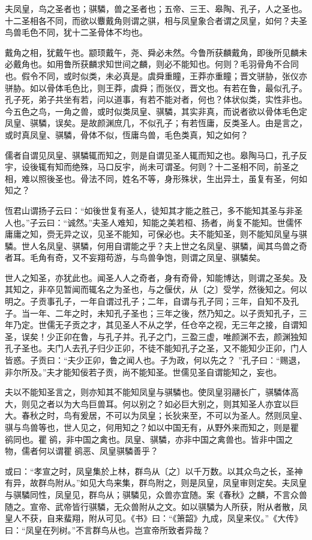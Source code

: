 \documentclass[]{article}
\begin{document}
夫凤皇，鸟之圣者也；骐驎，兽之圣者也；五帝、三王、皋陶、孔子，人之圣也。十二圣相各不同，而欲以麞戴角则谓之骐，相与凤皇象合者谓之凤皇，如何？夫圣鸟兽毛色不同，犹十二圣骨体不均也。

戴角之相，犹戴午也。颛顼戴午，尧、舜必未然。今鲁所获麟戴角，即後所见麟未必戴角也。如用鲁所获麟求知世间之麟，则必不能知也。何则？毛羽骨角不合同也。假令不同，或时似类，未必真是。虞舜重瞳，王莽亦重瞳；晋文骈胁，张仪亦骈胁。如以骨体毛色比，则王莽，虞舜；而张仪，晋文也。有若在鲁，最似孔子。孔子死，弟子共坐有若，问以道事，有若不能对者，何也？体状似类，实性非也。今五色之鸟，一角之兽，或时似类凤皇、骐驎，其实非真，而说者欲以骨体毛色定凤皇、骐驎，误矣。是故颜渊庶几，不似孔子；有若恆庸，反类圣人。由是言之，或时真凤皇、骐驎，骨体不似，恆庸鸟兽，毛色类真，知之如何？

儒者自谓见凤皇、骐驎辄而知之，则是自谓见圣人辄而知之也。皋陶马口，孔子反宇，设後辄有知而绝殊，马口反宇，尚未可谓圣。何则？十二圣相不同，前圣之相，难以照後圣也。骨法不同，姓名不等，身形殊状，生出异土，虽复有圣，何如知之？

恆君山谓扬子云曰：``如後世复有圣人，徒知其才能之胜己，多不能知其圣与非圣人也。''子云曰：``诚然。''夫圣人难知，知能之美若桓、扬者，尚复不能知。世儒怀庸庸之知，赍无异之议，见圣不能知，可保必也。夫不能知圣，则不能知凤皇与骐驎。世人名凤皇、骐驎，何用自谓能之乎？夫上世之名凤皇、骐驎，闻其鸟兽之奇者耳。毛角有奇，又不妄翔苟游，与鸟兽争饱，则谓之凤皇、骐驎矣。

世人之知圣，亦犹此也。闻圣人人之奇者，身有奇骨，知能博达，则谓之圣矣。及其知之，非卒见暂闻而辄名之为圣也，与之偃伏，从〔之〕受学，然後知之。何以明之。子贡事孔子，一年自谓过孔子；二年，自谓与孔子同；三年，自知不及孔子。当一年、二年之时，未知孔子圣也；三年之後，然乃知之。以子贡知孔子，三年乃定。世儒无子贡之才，其见圣人不从之学，任仓卒之视，无三年之接，自谓知圣，误矣！少正卯在鲁，与孔子并。孔子之门，三盈三虚，唯颜渊不去，颜渊独知孔子圣也。夫门人去孔子归少正卯，不徒不能知孔子之圣，又不能知少正卯，门人皆惑。子贡曰：``夫少正卯，鲁之闻人也。子为政，何以先之？
''孔子曰：``赐退，非尔所及。''夫才能知佞若子贡，尚不能知圣。世儒见圣自谓能知之，妄也。

夫以不能知圣言之，则亦知其不能知凤皇与骐驎也。使凤皇羽翮长广，骐驎体高大，则见之者以为大鸟巨兽耳。何以别之？如必巨大别之，则其知圣人亦宜以巨大。春秋之时，鸟有爰居，不可以为凤皇；长狄来至，不可以为圣人。然则凤皇、骐与鸟兽等也，世人见之，何用知之？如以中国无有，从野外来而知之，则是瞿鹆同也。瞿鹆，非中国之禽也。凤皇、骐驎，亦非中国之禽兽也。皆非中国之物，儒者何以谓瞿鹆恶、凤皇骐驎善乎？

或曰：``孝宣之时，凤皇集於上林，群鸟从〔之〕以千万数。以其众鸟之长，圣神有异，故群鸟附从。''如见大鸟来集，群鸟附之，则是凤皇，凤皇审则定矣。夫凤皇与骐驎同性，凤皇见，群鸟从；骐驎见，众兽亦宜随。案《春秋》之麟，不言众兽随之。宣帝、武帝皆行骐驎，无众兽附从之文。如以骐驎为人所获，附从者散，凤皇人不获，自来蜚翔，附从可见。《书》曰：``《箫韶》九成，凤皇来仪。''《大传》曰：``凤皇在列树。''不言群鸟从也。岂宣帝所致者异哉？
\end{document}
